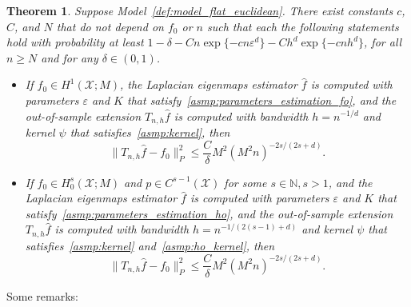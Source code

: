 \documentclass{article}
\newcommand{\1}{\mathbf{1}}
\newcommand{\mc}[1]{\mathcal{#1}}
\newcommand{\wh}[1]{\widehat{#1}}
\theoremstyle{alden}
\theoremstyle{aldenthm}
\newtheorem{theorem}{Theorem}
\theoremstyle{definition}
\theoremstyle{remark}
\begin{document}
\begin{theorem}
	\label{thm:laplacian_eigenmaps_estimation_out_of_sample}
	Suppose Model~\ref{def:model_flat_euclidean}. There exist constants $c$, $C$, and $N$ that do not depend on $f_0$ or $n$ such that each the following statements hold with probability at least $1 - \delta - Cn\exp\{-cn\varepsilon^d\} - Ch^d\exp\{-cnh^d\}$,  for all $n \geq N$ and for any $\delta \in (0,1)$.
	\begin{itemize}
		\item If $f_0 \in H^1(\mc{X};M)$, the Laplacian eigenmaps estimator $\wh{f}$ is computed with parameters $\varepsilon$ and $K$ that satisfy~\ref{asmp:parameters_estimation_fo}, and the out-of-sample extension $T_{n,h}\wh{f}$ is computed with bandwidth $h = n^{-1/d}$ and kernel $\psi$ that satisfies~\ref{asmp:kernel}, then
		\begin{equation*}
		\|T_{n,h}\wh{f} - f_0\|_P^2 \leq \frac{C}{\delta}M^2(M^2n)^{-2s/(2s + d)}.
		\end{equation*}
		\item If $f_0 \in H_0^s(\mc{X};M)$ and $p \in C^{s - 1}(\mc{X})$ for some $s \in \mathbb{N}, s > 1$, and the Laplacian eigenmaps estimator $\wh{f}$ is computed with parameters $\varepsilon$ and $K$ that satisfy~\ref{asmp:parameters_estimation_ho}, and the out-of-sample extension $T_{n,h}\wh{f}$ is computed with bandwidth $h = n^{-1/(2(s - 1) + d)}$ and kernel $\psi$ that satisfies~\ref{asmp:kernel} and~\ref{asmp:ho_kernel}, then
		\begin{equation*}
		\|T_{n,h}\wh{f} - f_0\|_P^2 \leq \frac{C}{\delta}M^2(M^2n)^{-2s/(2s + d)}.
		\end{equation*}
	\end{itemize}
\end{theorem}
Some remarks:
\end{document}
